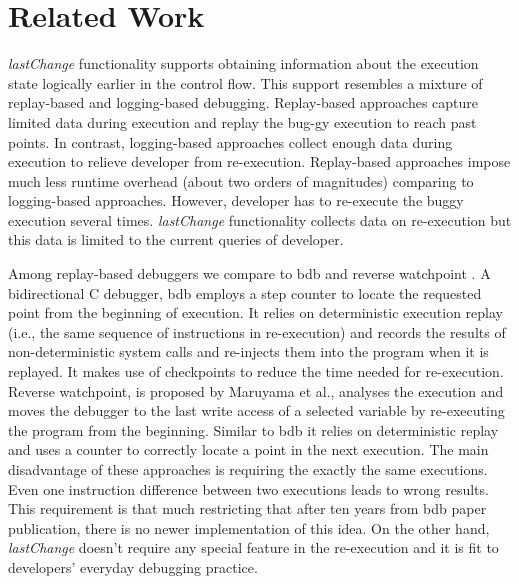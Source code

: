 \documentclass[preprint]{sigplanconf}
\begin{document}

\section{Related Work}
\label{sec:relatedWork}

\textit{lastChange} functionality supports obtaining information about
the execution state logically earlier in the control flow. This
support resembles a mixture of replay-based and logging-based
debugging. Replay-based approaches capture limited data during
execution and replay the bug-gy execution to reach past points. In
contrast, logging-based approaches collect enough data during
execution to relieve developer from re-execution. Replay-based
approaches impose much less runtime overhead (about two orders of
magnitudes) comparing to logging-based approaches. However, developer
has to re-execute the buggy execution several
times. \textit{lastChange} functionality collects data on re-execution
but this data is limited to the current queries of developer.

Among replay-based debuggers we compare to bdb \cite{Boothe} and
reverse watchpoint \cite{Maruyama}.  A bidirectional C debugger, bdb
employs a step counter to locate the requested point from the
beginning of execution. It relies on deterministic execution replay
(i.e., the same sequence of instructions in re-execution) and records
the results of non-deterministic system calls and re-injects them into
the program when it is replayed. It makes use of checkpoints to reduce
the time needed for re-execution.  Reverse watchpoint, is proposed by
Maruyama et al., analyses the execution and moves the debugger to the
last write access of a selected variable by re-executing the program
from the beginning\cite{Maruyama}.  Similar to bdb it relies on deterministic
replay and uses a counter to correctly locate a point in the next
execution. The main disadvantage of these approaches is requiring the
exactly the same executions. Even one instruction difference between
two executions leads to wrong results. This requirement is that
much restricting that after ten years from bdb paper publication,
there is no newer implementation of this idea. On the other hand,
\textit{lastChange} doesn't require any special feature in the
re-execution and it is fit to  developers' everyday debugging
practice.
\end{document}
